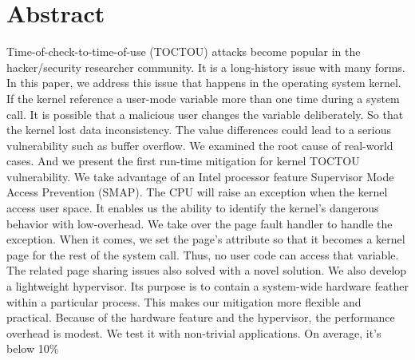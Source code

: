 \section{Abstract}

Time-of-check-to-time-of-use (TOCTOU) attacks become popular in the hacker/security researcher community. It is a long-history issue with many forms. In this paper, we address this issue that happens in the operating system kernel. If the kernel reference a user-mode variable more than one time during a system call. It is possible that a malicious user changes the variable deliberately. So that the kernel lost data inconsistency. The value differences could lead to a serious vulnerability such as buffer overflow.  We examined the root cause of real-world cases. And we present the first run-time mitigation for kernel TOCTOU vulnerability. We take advantage of an Intel processor feature Supervisor Mode Access Prevention (SMAP). The CPU will raise an exception when the kernel access user space. It enables us the ability to identify the kernel's dangerous behavior with low-overhead. We take over the page fault handler to handle the exception. When it comes, we set the page's attribute so that it becomes a kernel page for the rest of the system call.  Thus, no user code can access that variable. The related page sharing issues also solved with a novel solution. We also develop a lightweight hypervisor. Its purpose is to contain a system-wide hardware feather within a particular process.  This makes our mitigation more flexible and practical. Because of the hardware feature and the hypervisor, the performance overhead is modest. We test it with non-trivial applications. On average, it's below 10\%
